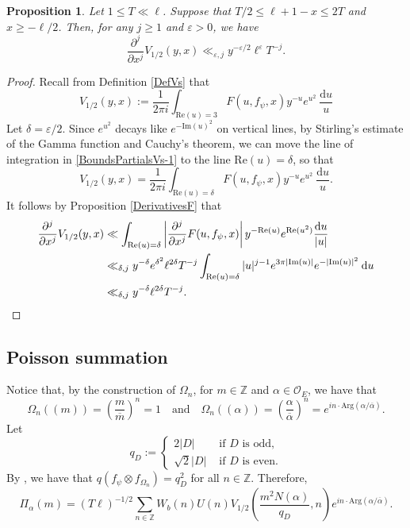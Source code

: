 \documentclass[11pt]{amsart}
\newcommand{\bigo}{\mathcal{O}}
\newcommand{\Z}{\mathbb{Z}}
\newtheorem{proposition}[theorem]{Proposition}
\theoremstyle{definition}
\theoremstyle{remark}
\begin{document}
\begin{proposition}\label{BoundsPartialsVs}
Let $1\leq T \ll \ell$. Suppose that $T/2 \leq \ell+1-x \leq 2T$ and $x\geq -\ell/2$. Then, for any $j\geq 1$ and $\varepsilon>0$, we have $$ \frac{\partial^{j}}{\partial x^{j}} V_{1/2}(y,x) \ll_{\varepsilon,j} y^{-\varepsilon/2} \ell^{\varepsilon} T^{-j}.$$    
\end{proposition}
    
\begin{proof}
Recall from Definition \ref{DefVs} that 
\begin{equation}
    V_{1/2}(y,x) := \frac{1}{2\pi i} \int_{\mathrm{Re}(u)=3} F(u,f_{\psi},x) y^{-u} e^{u^2} \: \frac{\mathrm{d}u}{u} \label{BoundsPartialsVs-1}
\end{equation}
Let $\delta = \varepsilon/2$. Since $e^{u^2}$ decays like $e^{-\mathrm{Im}(u)^2}$ on vertical lines, by Stirling's estimate of the Gamma function and Cauchy's theorem, we can move the line of integration in \eqref{BoundsPartialsVs-1} to the line $\mathrm{Re}(u) = \delta$, so that 
\begin{equation*}
    V_{1/2}(y,x) = \frac{1}{2\pi i} \int_{\mathrm{Re}(u)=\delta} F(u,f_{\psi},x) y^{-u} e^{u^2} \: \frac{\mathrm{d}u}{u}.
\end{equation*}
It follows by Proposition \ref{DerivativesF} that
\begin{align*}
    \frac{\partial^{j}}{\partial x^{j}} V_{1/2}(y,x) &\ll \int_{\mathrm{Re}(u)=\delta} \left| \frac{\partial^{j}}{\partial x^{j}} F(u,f_{\psi},x) \right| y^{-\mathrm{Re}(u)} e^{\mathrm{Re}(u^2)} \frac{\mathrm{d}u}{|u|} \\
    &\ll_{\delta,j} y^{-\delta} e^{\delta^2} \ell^{2\delta} T^{-j} \int_{\mathrm{Re}(u)=\delta} |u|^{j-1} e^{3\pi |\mathrm{Im}(u)|} e^{-|\mathrm{Im}(u)|^2} \: \mathrm{d}u \\
    &\ll_{\delta,j} y^{-\delta} \ell^{2\delta} T^{-j}. \qedhere
\end{align*}
\end{proof}




\subsection{Poisson summation}

Notice that, by the construction of $\Omega_{n}$, for $m\in \Z$ and $\alpha \in \bigo_E$, we have that $$ \Omega_{n}((m)) = \left(\frac{m}{\overline{m}}\right)^{n} = 1 \quad \text{and} \quad \Omega_{n}((\alpha)) = \left(\frac{\alpha}{\overline{\alpha}}\right)^{n} = e^{in\cdot \mathrm{Arg}(\alpha/\overline{\alpha})}.$$ Let
$$ q_D := \left\{ \begin{array}{ll}
    2|D| & \text{ if } D \text{ is odd}, \\
    \sqrt{2}|D| & \text{ if } D \text{ is even}.
\end{array} \right. $$ By \cite[Thm. 2.2]{WinnieLiRankinSelberg}, we have that $q(f_{\psi}\otimes f_{\Omega_{n}})=q_{D}^2$ for all $n\in \Z$. Therefore, $$ \Pi_{\alpha}(m) = (T\ell)^{-1/2} \sum_{n\in \Z} W_{b}(n) U(n) V_{1/2}\left(\frac{m^2 N(\alpha)}{q_D},n\right) e^{in\cdot \mathrm{Arg}(\alpha/\overline{\alpha})}. $$
\end{document}
